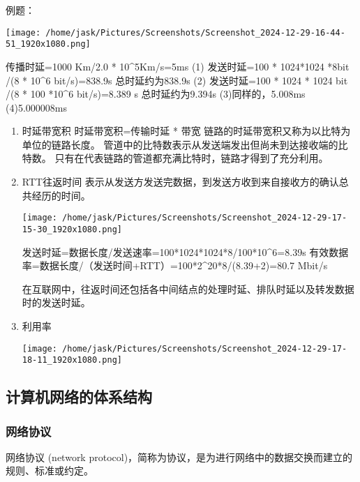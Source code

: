 \documentclass[11pt]{article}
\begin{document}
例题：
\begin{center}
\texttt{[image: /home/jask/Pictures/Screenshots/Screenshot\_2024-12-29-16-44-51\_1920x1080.png]}
\end{center}

传播时延=1000 Km/2.0 * 10\^{}5Km/s=5ms
(1) 发送时延=100 * 1024*1024 *8bit /(8 * 10\^{}6 bit/s)=838.9s
总时延约为838.9s
(2) 发送时延=100 * 1024 * 1024 bit /(8 * 100 *10\^{}6 bit/s)=8.389 s
总时延约为9.394s
(3)同样的，5.008ms
(4)5.000008ms
\begin{enumerate}
\item 时延带宽积
时延带宽积=传输时延 * 带宽
链路的时延带宽积又称为以比特为单位的链路长度。
管道中的比特数表示从发送端发出但尚未到达接收端的比特数。
只有在代表链路的管道都充满比特时，链路才得到了充分利用。

\item RTT往返时间
表示从发送方发送完数据，到发送方收到来自接收方的确认总共经历的时间。 

\begin{center}
\texttt{[image: /home/jask/Pictures/Screenshots/Screenshot\_2024-12-29-17-15-30\_1920x1080.png]}
\end{center}

发送时延=数据长度/发送速率=100*1024*1024*8/100*10\^{}6=8.39s
有效数据率=数据长度/（发送时间+RTT）=100*2\^{}20*8/(8.39+2)=80.7 Mbit/s

在互联网中，往返时间还包括各中间结点的处理时延、排队时延以及转发数据时的发送时延。

\item 利用率
\begin{center}
\texttt{[image: /home/jask/Pictures/Screenshots/Screenshot\_2024-12-29-17-18-11\_1920x1080.png]}
\end{center}
\end{enumerate}
\subsection{计算机网络的体系结构}
\label{sec:org549fee7}

\subsubsection{网络协议}
\label{sec:org9faa750}
网络协议 (network protocol)，简称为协议，是为进行网络中的数据交换而建立的规则、标准或约定。
\end{document}
